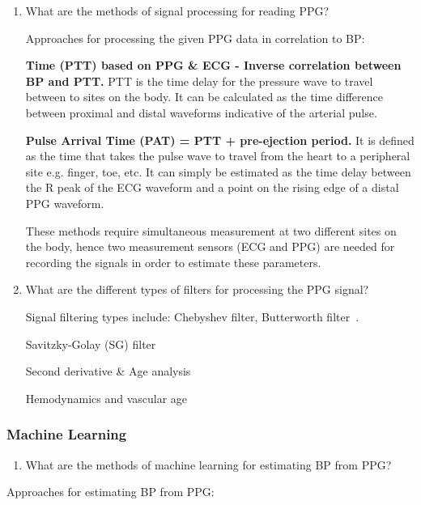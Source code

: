 \documentclass[10pt, bibliography=totoc]{scrartcl}
\begin{document}
\begin{enumerate}
\item What are the methods of signal processing for reading PPG?

Approaches for processing the given PPG data in correlation to BP:\newline

\textbf{Time (PTT) based on  PPG \& ECG - Inverse correlation between BP and PTT.} PTT is the time delay for the pressure wave to travel between to sites on the body. It can be calculated as the time difference between proximal and distal waveforms indicative of the arterial pulse.

\textbf{Pulse Arrival Time (PAT) = PTT + pre-ejection period.} It is defined as the time that takes the pulse wave to travel from the heart to a peripheral site e.g. finger, toe, etc. It can simply be estimated as the time delay between the R peak of the ECG waveform and a point on the rising edge of a distal PPG waveform.

These methods require simultaneous measurement at two different sites on the body, hence two measurement sensors (ECG and PPG) are needed for recording the signals in order to estimate these parameters.

\item What are the different types of filters for processing the PPG signal? 

Signal filtering types include: Chebyshev filter, Butterworth filter~\cite{liangOptimalFilterShort2018}.

Savitzky-Golay (SG) filter \cite{savitzkySmoothingDifferentiationData1964}

Second derivative \& Age analysis \cite{takazawaAssessmentVasoactiveAgents1998a}

Hemodynamics and vascular age \cite{charltonAssessingHemodynamicsPhotoplethysmogram2022}

\end{enumerate}

\subsubsection{Machine Learning}

\begin{enumerate}
\item What are the methods of machine learning for estimating BP from PPG?
\end{enumerate}

Approaches for estimating BP from PPG: \newline
\end{document}

